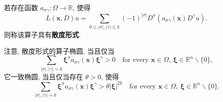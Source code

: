 \begin{Definition}
\label{def:general-divergence-form-operator}
若存在函数 $a_{\sigma\gamma}:\Omega\to\mathbb{R}$, 使得
\begin{equation}\label{eq:general-even-order-divergence-form-definition}
L(\bm{x},D)u=\sum_{0\leq|\sigma|,|\gamma|\leq k}(-1)^{|\sigma|}D^\sigma(a_{\sigma\gamma}(\bm{x})D^\gamma u).
\end{equation}
则称该算子具有\textbf{散度形式}.
\end{Definition}

\begin{Remark}
\label{rem:divergence-form-ellipticity-symbol}
注意, 散度形式的算子椭圆, 当且仅当
\begin{equation}\label{eq:divergence-form-ellipticity-symbol-condition}
\sum_{|\sigma|,|\gamma|=k}\bm{\xi}^\sigma a_{\sigma\gamma}(\bm{x})\bm{\xi}^\gamma>0\quad\text{for every }\bm{x}\in\Omega,\ \bm{\xi}\in\mathbb{R}^n\backslash\{0\},
\end{equation}
它一致椭圆, 当且仅当存在 $\theta>0$, 使得
\begin{equation}\label{eq:divergence-form-uniform-ellipticity-condition}
\sum_{|\sigma|,|\gamma|=k}\bm{\xi}^\sigma a_{\sigma\gamma}(\bm{x})\bm{\xi}^\gamma>\theta|\bm{\xi}|^{2k}\quad\text{for every }\bm{x}\in\Omega,\ \bm{\xi}\in\mathbb{R}^n\backslash\{0\}.
\end{equation}

\end{Remark}
